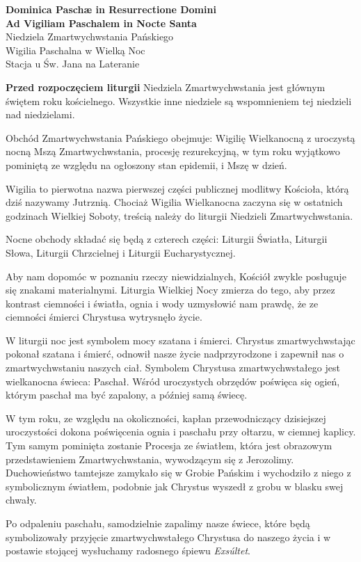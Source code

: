 \documentclass[10pt,oneside,final,notitlepage,a4paper,wide]{mwart}
\begin{document}
%
\begin{center}
	\LARGE{\textbf{Dominica Paschæ in Resurrectione Domini\\Ad Vigiliam Paschalem in Nocte Santa}}\\ \smallskip
	\small{Niedziela Zmartwychwstania Pańskiego\\Wigilia Paschalna w Wielką Noc\\ \smallskip Stacja u Św. Jana na Lateranie}
\end{center} \vspace{1cm}

	\textbf{Przed rozpoczęciem liturgii} Niedziela Zmartwychwstania jest głównym świętem roku kościelnego. Wszystkie inne niedziele są wspomnieniem tej niedzieli nad niedzielami.
\par Obchód Zmartwychwstania Pańskiego obejmuje: Wigilię Wielkanocną z uroczystą nocną Mszą Zmartwychwstania, procesję rezurekcyjną, w tym roku wyjątkowo pominiętą ze względu na ogłoszony stan epidemii, i Mszę w dzień.
\par Wigilia to pierwotna nazwa pierwszej części publicznej modlitwy Kościoła, którą dziś nazywamy Jutrznią. Chociaż Wigilia Wielkanocna zaczyna się w ostatnich godzinach Wielkiej Soboty, treścią należy do liturgii Niedzieli Zmartwychwstania.
\par Nocne obchody składać się będą z czterech części: Liturgii Światła, Liturgii Słowa, Liturgii Chrzcielnej i Liturgii Eucharystycznej.
\par Aby nam dopomóc w poznaniu rzeczy niewidzialnych, Kościół zwykle posługuje się znakami materialnymi. Liturgia Wielkiej Nocy zmierza do tego, aby przez kontrast ciemności i światła, ognia i wody uzmysłowić nam prawdę, że ze ciemności śmierci Chrystusa wytrysnęło życie.
\par W liturgii noc jest symbolem mocy szatana i śmierci. Chrystus zmartwychwstając pokonał szatana i śmierć, odnowił nasze życie nadprzyrodzone i zapewnił nas o zmartwychwstaniu naszych ciał. Symbolem Chrystusa zmartwychwstałego jest wielkanocna świeca: Paschał. Wśród uroczystych obrzędów poświęca się ogień, którym paschał ma być zapalony, a później samą świecę.
\par W tym roku, ze względu na okoliczności, kapłan przewodniczący dzisiejszej uroczystości dokona poświęcenia ognia i paschału przy ołtarzu, w ciemnej kaplicy. Tym samym pominięta zostanie Procesja ze światłem, która jest obrazowym przedstawieniem Zmartwychwstania, wywodzącym się z Jerozolimy. Duchowieństwo tamtejsze zamykało się w Grobie Pańskim i wychodziło z niego z symbolicznym światłem, podobnie jak Chrystus wyszedł z grobu w blasku swej chwały.
\par Po odpaleniu paschału, samodzielnie zapalimy nasze świece, które będą symbolizowały przyjęcie zmartwychwstałego Chrystusa do naszego życia i w postawie stojącej wysłuchamy radosnego śpiewu \emph{Exsúltet}. \bigskip
\end{document}
